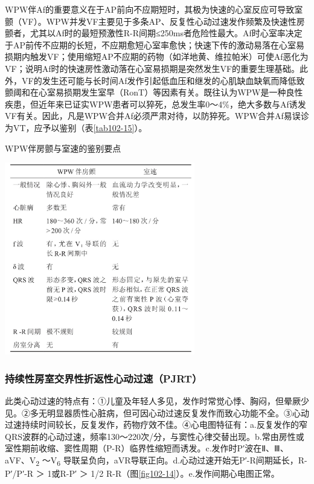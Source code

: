 WPW伴Af的重要意义在于AP前向不应期短时，其极为快速的心室反应可导致室颤（VF）。WPW并发VF主要见于多条AP、反复性心动过速发作频繁及快速性房颤者，尤其以Af时的最短预激性R-R间期≤250ms者危险性最大。Af时心室率决定于AP前传不应期的长短，不应期愈短心室率愈快；快速下传的激动易落在心室易损期内触发VF；使用缩短AP不应期的药物（如洋地黄、维拉帕米）可使Af恶化为VF；说明Af时的快速房性激动落在心室易损期是突然发生VF的重要生理基础。此外，VF的发生还可能与长时间Af发作引起低血压和继发的心肌缺血缺氧而降低致颤阈和在心室易损期发生室早（RonT）等因素有关。既往认为WPW是一种良性疾患，但近年来已证实WPW患者可以猝死，总发生率0～4\%，绝大多数与Af诱发VF有关。因此，凡是WPW合并Af必须严肃对待，以防猝死。WPW合并Af易误诊为VT，应予以鉴别（表\ref{tab102-15}）。

\begin{table}[htbp]
\centering
\caption{WPW伴房颤与室速的鉴别要点}
\label{tab102-15}
\includegraphics[width=3.27083in,height=3.3125in]{./images/Image00450.jpg}
\end{table}

\subsubsection{持续性房室交界性折返性心动过速（PJRT）}

此类心动过速的特点有：①儿童及年轻人多见，发作时常觉心悸、胸闷，但晕厥少见。②多无明显器质性心脏病，但可因心动过速反复发作而致心功能不全。③心动过速持续时间较长，反复发作，药物疗效不佳。④心电图特征有：a.反复发作的窄QRS波群的心动过速，频率130～220次/分，与窦性心律交替出现。b.常由房性或室性期前收缩、窦性周期（P-R）临界性缩短而诱发。c.发作时P′波在Ⅱ、Ⅲ、aVF、V\textsubscript{2}
～V\textsubscript{6}
导联呈负向，aVR导联正向。d.心动过速开始无P′-R间期延长，R-P′/P′-R ＞
1或R-P′ ＞ 1/2 R-R（图\ref{fig102-14}）。e.发作间期心电图正常。

